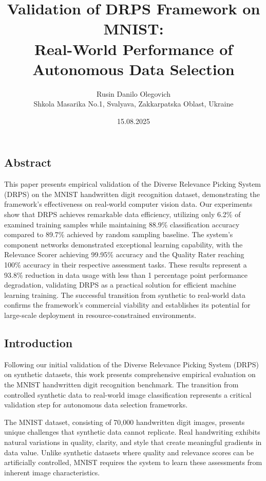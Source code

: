 \documentclass[12pt]{article}
\title{Validation of DRPS Framework on MNIST: \\Real-World Performance of Autonomous Data Selection}
\author{Rusin Danilo Olegovich\\Shkola Masarika No.1, Svalyava, Zakkarpatska Oblast, Ukraine}
\date{15.08.2025}
\begin{document}
\maketitle

\subsection{Abstract}\label{abstract}

This paper presents empirical validation of the Diverse Relevance Picking System (DRPS) on the MNIST handwritten digit recognition dataset, demonstrating the framework's effectiveness on real-world computer vision data. Our experiments show that DRPS achieves remarkable data efficiency, utilizing only 6.2\% of examined training samples while maintaining 88.9\% classification accuracy compared to 89.7\% achieved by random sampling baseline. The system's component networks demonstrated exceptional learning capability, with the Relevance Scorer achieving 99.95\% accuracy and the Quality Rater reaching 100\% accuracy in their respective assessment tasks. These results represent a 93.8\% reduction in data usage with less than 1 percentage point performance degradation, validating DRPS as a practical solution for efficient machine learning training. The successful transition from synthetic to real-world data confirms the framework's commercial viability and establishes its potential for large-scale deployment in resource-constrained environments.

\subsection{Introduction}\label{introduction}

Following our initial validation of the Diverse Relevance Picking System (DRPS) on synthetic datasets, this work presents comprehensive empirical evaluation on the MNIST handwritten digit recognition benchmark. The transition from controlled synthetic data to real-world image classification represents a critical validation step for autonomous data selection frameworks.

The MNIST dataset, consisting of 70,000 handwritten digit images, presents unique challenges that synthetic data cannot replicate. Real handwriting exhibits natural variations in quality, clarity, and style that create meaningful gradients in data value. Unlike synthetic datasets where quality and relevance scores can be artificially controlled, MNIST requires the system to learn these assessments from inherent image characteristics.
\end{document}
